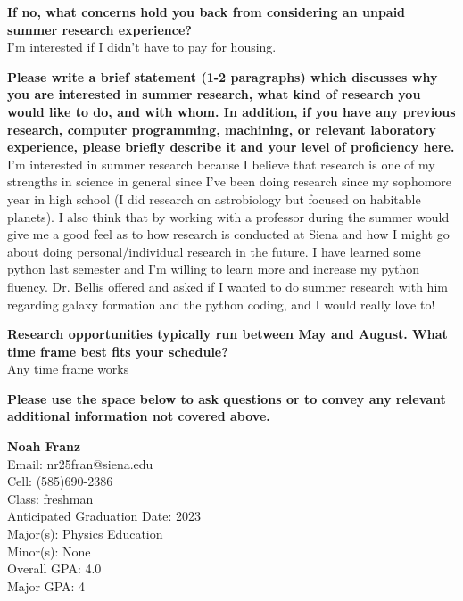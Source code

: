 \documentclass[12pt,preprint]{aastex}
\begin{document}
\vspace*{3mm}
{\bf If no, what concerns hold you back from considering an unpaid summer research experience?}\\
I'm interested if I didn't have to pay for housing.

\vspace*{3mm}
{\bf Please write a brief statement (1-2 paragraphs) which discusses why you are interested in summer research, what kind of research you would like to do, and with whom.  In addition, if you have any previous research, computer programming, machining, or relevant laboratory experience, please briefly describe it and your level of proficiency here.}\\
I'm interested in summer research because I believe that research is one of my strengths in science in general since I've been doing research since my sophomore year in high school (I did research on astrobiology but focused on habitable planets). I also think that by working with a professor during the summer would give me a good feel as to how research is conducted at Siena and how I might go about doing personal/individual research in the future. I have learned some python last semester and I'm willing to learn more and increase my python fluency.  Dr. Bellis offered and asked if I wanted to do summer research with him regarding galaxy formation and the python coding, and I would really love to!

\vspace*{3mm}
{\bf Research opportunities typically run between May and August.  What time frame best fits your schedule?}\\
Any time frame works

\vspace*{3mm}
{\bf Please use the space below to ask questions or to convey any relevant additional information not covered above.}\\
\vspace*{3mm}

\vspace*{3mm}
\clearpage
{\large {\bf Noah Franz}}\\
Email: nr25fran@siena.edu\\
Cell: (585)690-2386\\
Class: freshman\\
Anticipated Graduation Date: 2023\\
Major(s): Physics Education\\
Minor(s): None\\
Overall GPA: 4.0\\
Major GPA: 4\\
\end{document}
